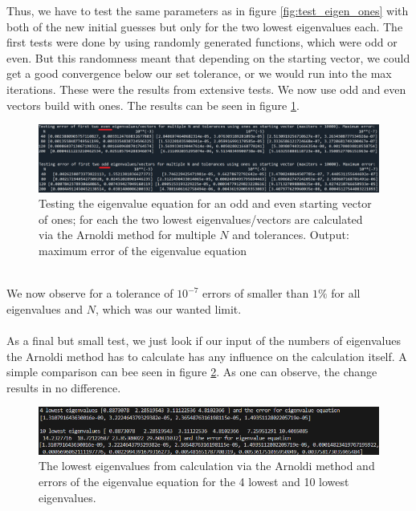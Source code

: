 \documentclass[11pt, letterpaper, onecolumn]{article}
\begin{document}
	Thus, we have to test the same parameters as in figure \ref{fig:test_eigen_ones} with both of the new initial guesses but only for the two lowest eigenvalues each. The first tests were done by using randomly generated functions, which were odd or even. But this randomness meant that depending on the starting vector, we could get a good convergence below our set tolerance, or we would run into the max iterations. These were the results from extensive tests.  We now use odd and even vectors build with ones. The results can be seen in figure \ref{fig:test_eigen_even-odd}.
	\begin{figure} [H] 
	\begin{center}	
	\includegraphics[width=19cm]{"test_eigen_even-odd.png"}
	\caption{Testing the eigenvalue equation for an odd and even starting vector of ones; for each the two lowest eigenvalues/vectors are calculated via the Arnoldi method for multiple $N$ and tolerances. Output: maximum error of the eigenvalue equation} \label{fig:test_eigen_even-odd}
	\end{center}
	\end{figure}
	\\
	We now observe for a tolerance of $10^{-7}$ errors of smaller than $1\%$ for all eigenvalues and $N$, which was our wanted limit.
	\\
	\\
	As a final but small test, we just look if our input of the numbers of eigenvalues the Arnoldi method has to calculate has any influence on the calculation itself. A simple comparison can bee seen in figure \ref{fig:test_eigen_number}. As one can observe, the change results in no difference.
	\begin{figure} [H] 
	\begin{center}	
	\includegraphics[width=19cm]{"test_eigen_numbers.png"}
	\caption{The lowest eigenvalues from calculation via the Arnoldi method and errors of the eigenvalue equation for the 4 lowest and 10 lowest eigenvalues.} \label{fig:test_eigen_number}
	\end{center}
	\end{figure}
\end{document}
